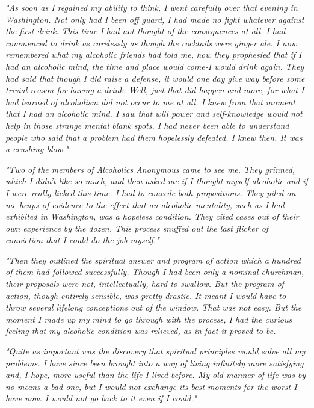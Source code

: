 \begin{biblechapter}
    \emph{"As soon as I regained my ability to think, I went carefully over that evening in Washington. 
\verse Not only had I been off guard, I had made no fight whatever against the first drink. 
\verse This time I had not thought of the consequences at all. 
\verse I had commenced to drink as carelessly as though the cocktails were ginger ale. 
\verse I now remembered what my alcoholic friends had told me, 
    how they prophesied that if I had an alcoholic mind, 
    the time and place would come-I would drink again. 
\verse They had said that though I did raise a defense, 
    it would one day give way 
    before some trivial reason for having a drink. 
\verse Well, just that did happen and more, 
    for what I had learned of alcoholism did not occur to me at all. 
\verse I knew from that moment that I had an alcoholic mind. 
\verse I saw that will power and self-knowledge 
    would not help in those strange mental blank spots. 
\verse I had never been able to understand people who said 
    that a problem had them hopelessly defeated. 
\verse I knew then. 
\verse It was a crushing blow."
}

    \emph{"Two of the members of Alcoholics Anonymous came to see me. 
\verse They grinned, which I didn't like so much, 
    and then asked me if I thought myself alcoholic 
    and if I were really licked this time. 
\verse I had to concede both propositions. 
\verse They piled on me heaps of evidence to the effect 
    that an alcoholic mentality, 
    such as I had exhibited in Washington, was a hopeless condition. 
\verse They cited cases out of their own experience by the dozen. 
\verse This process snuffed out the last flicker of conviction 
    that I could do the job myself."
}

    \emph{"Then they outlined the spiritual answer 
        and program of action which a hundred of them 
        had followed successfully. 
\verse Though I had been only a nominal churchman, 
    their proposals were not, 
    intellectually, hard to swallow. 
\verse But the program of action, 
    though entirely sensible, 
    was pretty drastic. 
\verse It meant I would have to throw 
    several lifelong conceptions out of the window. 
\verse That was not easy. 
\verse But the moment I made up my mind to go through with the process, 
    I had the curious feeling that my alcoholic condition was relieved, 
    as in fact it proved to be.
}

    \emph{"Quite as important was the discovery that 
        spiritual principles would solve all my problems. 
\verse I have since been brought into a way of living 
    infinitely more satisfying and, 
    I hope, more useful than the life I lived before. 
\verse My old manner of life was by no means a bad one, 
    but I would not exchange its best moments for the worst I have now. 
\verse I would not go back to it even if I could."
}


\end{biblechapter}
